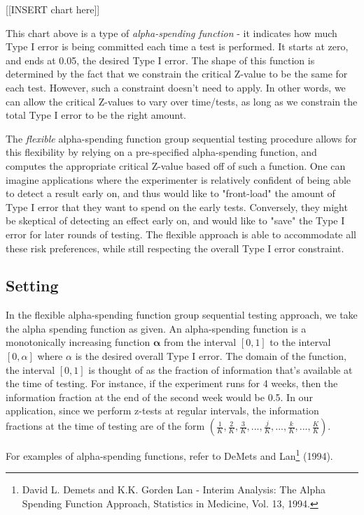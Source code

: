 \documentclass[final,3p,times]{elsarticle}
\begin{document}
[[INSERT chart here]]

This chart above is a type of \emph{alpha-spending function} - it indicates how much Type I error is being committed each time a test is performed. It starts at zero, and ends at 0.05, the desired Type I error. The shape of this function is determined by the fact that we constrain the critical Z-value to be the same for each test. However, such a constraint doesn't need to apply. In other words, we can allow the critical Z-values to vary over time/tests, as long as we constrain the total Type I error to be the right amount. 

The \emph{flexible} alpha-spending function group sequential testing procedure allows for this flexibility by relying on a pre-specified alpha-spending function, and computes the appropriate critical Z-value based off of such a function. One can imagine applications where the experimenter is relatively confident of being able to detect a result early on, and thus would like to "front-load" the amount of Type I error that they want to spend on the early tests. Conversely, they might be skeptical of detecting an effect early on, and would like to "save" the Type I error for later rounds of testing. The flexible approach is able to accommodate all these risk preferences, while still respecting the overall Type I error constraint.
\subsection{Setting}
In the flexible alpha-spending function group sequential testing approach, we take the alpha spending function as given. An alpha-spending function is a monotonically increasing function $\bm \alpha$ from the interval $[0,1]$ to the interval $[0,\alpha]$ where $\alpha$ is the desired overall Type I error.  The domain of the function, the interval $[0,1]$ is thought of as the fraction of information that's available at the time of testing. For instance, if the experiment runs for 4 weeks, then the information fraction at the end of the second week would be 0.5. In our application, since we perform z-tests at regular intervals, the information fractions at the time of testing are of the form $(\frac 1 K, \frac 2 K, \frac 3 K, ..., \frac j K,..., \frac k K, ..., \frac K K)$.


For examples of alpha-spending functions, refer to DeMets and Lan\footnote{David L. Demets and K.K. Gorden Lan - Interim Analysis: The Alpha Spending Function Approach, Statistics in Medicine, Vol. 13, 1994.} (1994).
\end{document}
